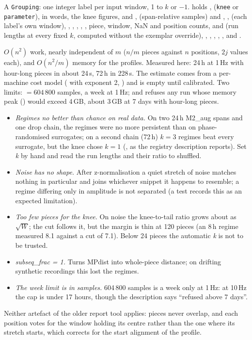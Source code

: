 A \texttt{Grouping}: one integer label per input window, 1 to $k$ or $-1$.  holds
,  (\texttt{knee} or \texttt{parameter}),  in words, the knee
figures,  and ,  (span-relative samples) and
, ,  (each label's own window),
, , , , , piece, window, NaN
and position counts,  and  (run lengths at every fixed $k$, computed
without the exemplar override), , ,
, , ,  and
.

$O(n^2)$ work, nearly independent of $m$ ($n/m$ pieces against $n$ positions, $2j$ values each),
and $O(n^2/m)$ memory for the profiles. Measured here: 24\,h at 1\,Hz with hour-long pieces in about
24\,s, 72\,h in 228\,s. The estimate comes from a per-machine cost model
( with exponent 2, ) and is empty until
calibrated. Two limits:  $= 604\,800$ samples, a week at 1\,Hz; and
 refuses any run whose memory peak () would exceed 4\,GB,
about 3\,GB at 7 days with hour-long pieces.

\begin{itemize}
\item \emph{Regimes no better than chance on real data.} On two 24\,h M2\_aug spans and one drop
  chain, the regimes were no more persistent than on phase-randomised surrogates; on a second chain
  (72\,h) $k = 3$ regimes beat every surrogate, but the knee chose $k = 1$
  (, as the registry description reports). Set
  \emph{k} by hand and read the run lengths and their ratio to shuffled.
\item \emph{Noise has no shape.} After z-normalisation a quiet stretch of noise matches nothing in
  particular and joins whichever snippet it happens to resemble; a regime differing only in
  amplitude is not separated (a test records this as an expected limitation).
\item \emph{Too few pieces for the knee.} On noise the knee-to-tail ratio grows about as
  $\sqrt{W}$; the cut follows it, but the margin is thin at 120 pieces (an 8\,h regime measured 8.1
  against a cut of 7.1). Below 24 pieces the automatic \emph{k} is not to be trusted.
\item \emph{subseq\_frac = 1.} Turns MPdist into whole-piece distance; on drifting synthetic
  recordings this lost the regimes.
\item \emph{The week limit is in samples.} 604\,800 samples is a week only at 1\,Hz: at 10\,Hz the
  cap is under 17 hours, though the description says ``refused above 7 days''.
\end{itemize}
Neither artefact of the older report tool applies: pieces never overlap, and each position votes
for the window holding its centre rather than the one where its stretch starts, which corrects for
the start alignment of the profile.

